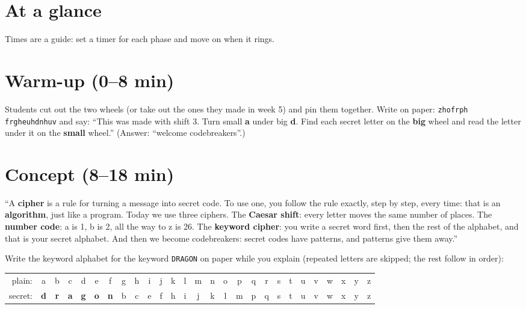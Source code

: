 \section{At a glance}
Times are a guide: set a timer for each phase and move on when it rings.
\begin{timeplan}
\end{timeplan}

\section{Warm-up (0--8 min)}
\begin{unplugged}
Students cut out the two wheels (or take out the ones they made in week 5) and pin them together. Write on paper:
\texttt{zhofrph frgheuhdnhuv} and say: \enquote{This was made with shift 3. Turn small \textbf{a} under big \textbf{d}. Find each secret letter
on the \textbf{big} wheel and read the letter under it on the \textbf{small} wheel.}
(Answer: \enquote{welcome codebreakers}.)
\end{unplugged}

\section{Concept (8--18 min)}
\begin{teacherscript}[Say]
\enquote{A \textbf{cipher} is a rule for turning a message into secret code. To use one, you follow the rule exactly, step by step, every time:
that is an \textbf{algorithm}, just like a program. Today we use three ciphers.
The \textbf{Caesar shift}: every letter moves the same number of places.
The \textbf{number code}: a is 1, b is 2, all the way to z is 26.
The \textbf{keyword cipher}: you write a secret word first, then the rest of the alphabet, and that is your secret alphabet.
And then we become codebreakers: secret codes have patterns, and patterns give them away.}
\end{teacherscript}
Write the keyword alphabet for the keyword \texttt{DRAGON} on paper while you explain (repeated letters are skipped; the rest follow in order):
\begin{center}
\setlength{\tabcolsep}{2.2pt}\small
\begin{tabular}{r*{26}{c}}
plain: & a&b&c&d&e&f&g&h&i&j&k&l&m&n&o&p&q&r&s&t&u&v&w&x&y&z \\
secret: & \textbf{d}&\textbf{r}&\textbf{a}&\textbf{g}&\textbf{o}&\textbf{n}&b&c&e&f&h&i&j&k&l&m&p&q&s&t&u&v&w&x&y&z \\
\end{tabular}
\end{center}

